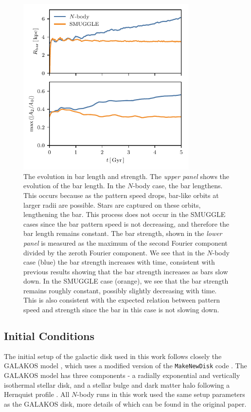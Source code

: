 \documentclass[twocolumn,linenumbers]{aastex631}
\newcommand{\Nbody}{$N$-body}
\newcommand{\SMUGGLE}{SMUGGLE}
\begin{document}
\begin{figure}
    \centering
    \includegraphics[width=9cm]{fig/Rb_A2.pdf}
    \caption{The evolution in bar length and strength. The \textit{upper panel}
    shows the evolution of the bar length. In the \Nbody{} case, the bar
    lengthens. This occurs because as the pattern speed drops, bar-like orbits
    at larger radii are possible. Stars are captured on these orbits,
    lengthening the bar. This process does not occur in the \SMUGGLE{} cases since
    the bar pattern speed is not decreasing, and therefore the bar length
    remains constant. The bar strength, shown in the \textit{lower panel} is
    measured as the maximum of the second Fourier component divided by the
    zeroth Fourier component. We see that in the \Nbody{} case (blue) the bar
    strength increases with time, consistent with previous results showing that
    the bar strength increases as bars slow down. In the \SMUGGLE{} case (orange),
    we see that the bar strength remains roughly constant, possibly slightly
    decreasing with time. This is also consistent with the expected relation
    between pattern speed and strength since the bar in this case is not slowing
    down.}
    \label{fig:strength}
\end{figure}
\subsection{Initial Conditions}
The initial setup of the galactic disk used in this work follows closely the
GALAKOS model \citep{2020ApJ...890..117D}, which uses a modified version of the
\texttt{MakeNewDisk} code \citep{2005MNRAS.361..776S}. The GALAKOS model has
three components - a radially exponential and vertically isothermal stellar
disk, and a stellar bulge and dark matter halo following a Hernquist profile
\citep{1990ApJ...356..359H}. All \Nbody{} runs in this work used the same setup
parameters as the GALAKOS disk, more details of which can be found in the
original paper.
\end{document}
